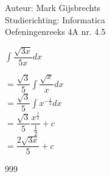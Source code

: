\documentclass[a4paper]{article}
\newcommand{\dint}{\displaystyle\int}
\begin{document}
\noindent \large Auteur: Mark Gijsbrechts \\
\noindent \large Studierichting: Informatica\\
\noindent \large Oefeningenreeks 4A nr. 4.5\\

\medskip

\normalsize





$\dint \dfrac{\sqrt{3x}}{5x} dx $

$= \dfrac{\sqrt{3}}{5} \dint \dfrac{\sqrt{x}}{x} dx$ \\

$= \dfrac{\sqrt{3}}{5} \dint x^{-\tfrac{1}{2}} dx$ \\

$= \dfrac{\sqrt{3}}{5} \dfrac{x^{\tfrac{1}{2}}}{\tfrac{1}{2}} + c$ \\

$= \dfrac{2\sqrt{3x}}{5} + c$ \\


\begin{thebibliography}{999}
\end{thebibliography}
\end{document}
